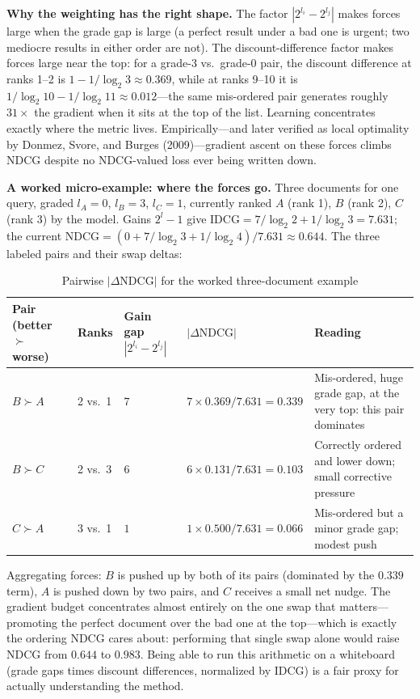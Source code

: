 \textbf{Why the weighting has the right shape.} The factor $|2^{l_i} - 2^{l_j}|$ makes forces large when the grade gap is large (a perfect result under a bad one is urgent; two mediocre results in either order are not). The discount-difference factor makes forces large near the top: for a grade-3 vs.\ grade-0 pair, the discount difference at ranks 1--2 is $1 - 1/\log_2 3 \approx 0.369$, while at ranks 9--10 it is $1/\log_2 10 - 1/\log_2 11 \approx 0.012$---the same mis-ordered pair generates roughly $31\times$ the gradient when it sits at the top of the list. Learning concentrates exactly where the metric lives. Empirically---and later verified as local optimality by Donmez, Svore, and Burges (2009)---gradient ascent on these forces climbs NDCG despite no NDCG-valued loss ever being written down.

\textbf{A worked micro-example: where the forces go.} Three documents for one query, graded $l_A = 0$, $l_B = 3$, $l_C = 1$, currently ranked $A$ (rank 1), $B$ (rank 2), $C$ (rank 3) by the model. Gains $2^l - 1$ give $\text{IDCG} = 7/\log_2 2 + 1/\log_2 3 = 7.631$; the current $\text{NDCG} = (0 + 7/\log_2 3 + 1/\log_2 4)/7.631 \approx 0.644$. The three labeled pairs and their swap deltas:

\begin{table}[H]
\centering
\small
\caption{Pairwise $|\Delta\text{NDCG}|$ for the worked three-document example}
\label{sr:tab:lambda_example}
\begin{tabularx}{\textwidth}{llllX}
\toprule
\textbf{Pair (better $\succ$ worse)} & \textbf{Ranks} & \textbf{Gain gap $|2^{l_i} - 2^{l_j}|$} & \textbf{$|\Delta\text{NDCG}|$} & \textbf{Reading} \\
\midrule
$B \succ A$ & 2 vs.\ 1 & $7$ & $7 \times 0.369 / 7.631 = 0.339$ & Mis-ordered, huge grade gap, at the very top: this pair dominates \\
$B \succ C$ & 2 vs.\ 3 & $6$ & $6 \times 0.131 / 7.631 = 0.103$ & Correctly ordered and lower down; small corrective pressure \\
$C \succ A$ & 3 vs.\ 1 & $1$ & $1 \times 0.500 / 7.631 = 0.066$ & Mis-ordered but a minor grade gap; modest push \\
\bottomrule
\end{tabularx}
\end{table}

Aggregating forces: $B$ is pushed up by both of its pairs (dominated by the $0.339$ term), $A$ is pushed down by two pairs, and $C$ receives a small net nudge. The gradient budget concentrates almost entirely on the one swap that matters---promoting the perfect document over the bad one at the top---which is exactly the ordering NDCG cares about: performing that single swap alone would raise NDCG from $0.644$ to $0.983$. Being able to run this arithmetic on a whiteboard (grade gaps times discount differences, normalized by IDCG) is a fair proxy for actually understanding the method.

